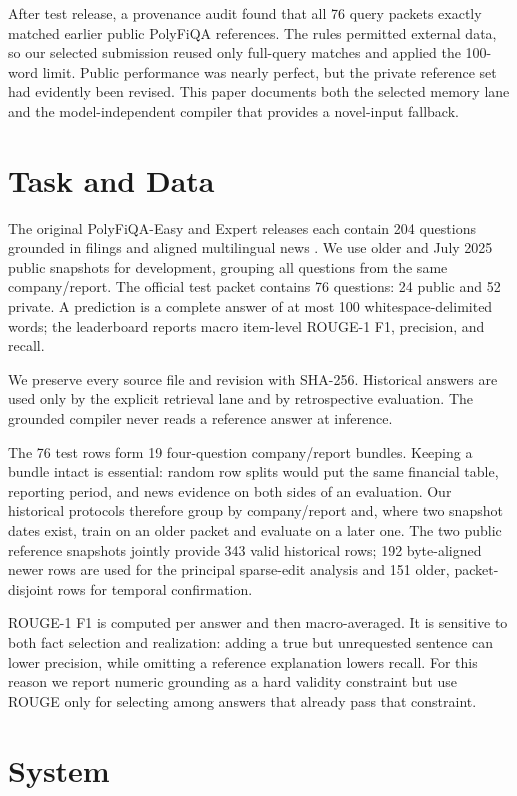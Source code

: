 \documentclass[11pt]{article}
\begin{document}
After test release, a provenance audit found that all 76 query packets exactly matched earlier public PolyFiQA references. The rules permitted external data, so our selected submission reused only full-query matches and applied the 100-word limit. Public performance was nearly perfect, but the private reference set had evidently been revised. This paper documents both the selected memory lane and the model-independent compiler that provides a novel-input fallback.

\section{Task and Data}
The original PolyFiQA-Easy and Expert releases each contain 204 questions grounded in filings and aligned multilingual news \citep{peng-etal-2026-multifinben}. We use older and July 2025 public snapshots for development, grouping all questions from the same company/report. The official test packet contains 76 questions: 24 public and 52 private. A prediction is a complete answer of at most 100 whitespace-delimited words; the leaderboard reports macro item-level ROUGE-1 F1, precision, and recall.

We preserve every source file and revision with SHA-256. Historical answers are used only by the explicit retrieval lane and by retrospective evaluation. The grounded compiler never reads a reference answer at inference.

The 76 test rows form 19 four-question company/report bundles.  Keeping a
bundle intact is essential: random row splits would put the same financial
table, reporting period, and news evidence on both sides of an evaluation.
Our historical protocols therefore group by company/report and, where two
snapshot dates exist, train on an older packet and evaluate on a later one.
The two public reference snapshots jointly provide 343 valid historical rows;
192 byte-aligned newer rows are used for the principal sparse-edit analysis and
151 older, packet-disjoint rows for temporal confirmation.

ROUGE-1 F1 is computed per answer and then macro-averaged.  It is sensitive to
both fact selection and realization: adding a true but unrequested sentence can
lower precision, while omitting a reference explanation lowers recall.  For
this reason we report numeric grounding as a hard validity constraint but use
ROUGE only for selecting among answers that already pass that constraint.

\section{System}
\end{document}
